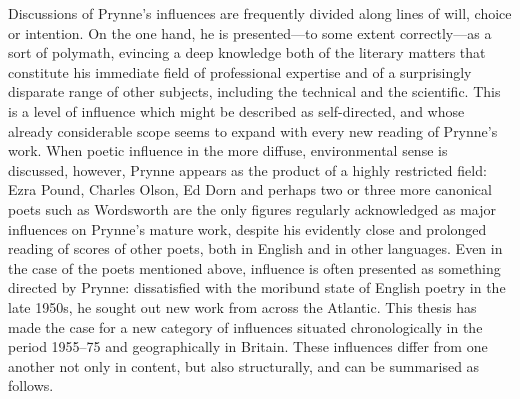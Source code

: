 \documentclass[]{article}
\begin{document}
Discussions of Prynne's influences are frequently divided along lines of
will, choice or intention. On the one hand, he is presented---to some
extent correctly---as a sort of polymath, evincing a deep knowledge both
of the literary matters that constitute his immediate field of
professional expertise and of a surprisingly disparate range of other
subjects, including the technical and the scientific. This is a level of
influence which might be described as self-directed, and whose already
considerable scope seems to expand with every new reading of Prynne's
work. When poetic influence in the more diffuse, environmental sense is
discussed, however, Prynne appears as the product of a highly restricted
field: Ezra Pound, Charles Olson, Ed Dorn and perhaps two or three more
canonical poets such as Wordsworth are the only figures regularly
acknowledged as major influences on Prynne's mature work, despite his
evidently close and prolonged reading of scores of other poets, both in
English and in other languages. Even in the case of the poets mentioned
above, influence is often presented as something directed by Prynne:
dissatisfied with the moribund state of English poetry in the late
1950s, he sought out new work from across the Atlantic. This thesis has
made the case for a new category of influences situated chronologically
in the period 1955--75 and geographically in Britain. These influences
differ from one another not only in content, but also structurally, and
can be summarised as follows.
\end{document}
